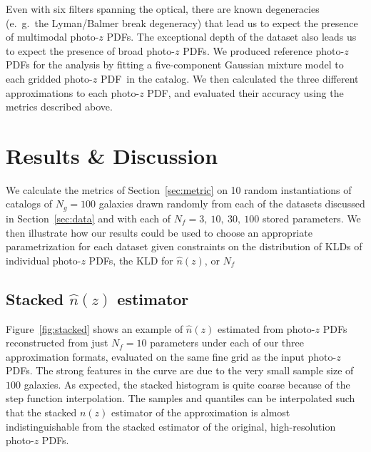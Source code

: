 \documentclass[\docopts]{\docclass}
\newcommand{\pz}{photo-$z$ PDF}
\begin{document}
Even with six filters spanning the optical, there are known degeneracies 
(e.~g.~the Lyman/Balmer break degeneracy) that lead us to expect the presence 
of multimodal \pz s.
The exceptional depth of the dataset also leads us to expect the presence of 
broad \pz s.
We produced reference \pz s for the analysis by fitting a five-component 
Gaussian mixture model to each gridded \pz\ in the catalog.
We then calculated the three different approximations to each \pz, and 
evaluated their accuracy using the metrics described above.


\section{Results \& Discussion}
\label{sec:results}



We calculate the metrics of Section~\ref{sec:metric} on 10 random 
instantiations of catalogs of $N_{g}=100$ galaxies drawn randomly from each of 
the datasets discussed in Section~\ref{sec:data} and with each of $N_{f}=3,\ 
10,\ 30,\ 100$ stored parameters.
We then illustrate how our results could be used to choose an appropriate 
parametrization for each dataset given constraints on the distribution of KLDs 
of individual \pz s, the KLD for $\hat{n}(z)$, or $N_{f}$


\subsection{Stacked $\hat{n}(z)$ estimator}
\label{sec:stacked_results}

Figure~\ref{fig:stacked} shows an example of $\hat{n}(z)$ estimated from \pz s 
reconstructed from just $N_{f}=10$ parameters under each of our three 
approximation formats, evaluated on the same fine grid as the input \pz s.
The strong features in the curve are due to the very small sample size of $100$ 
galaxies.
As expected, the stacked histogram is quite coarse because of the step function 
interpolation.
The samples and quantiles can be interpolated such that the stacked $n(z)$ 
estimator of the approximation is almost indistinguishable from the stacked 
estimator of the original, high-resolution \pz s.
\end{document}
